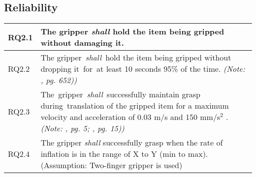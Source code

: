 \documentclass[lettersize,journal]{IEEEtran}
\begin{document}
\subsection{Reliability}\label{reliability}
\begin{center}
	\begin{tabular}{|p{7mm}|p{72mm}|}
		\hline
		RQ2.1 & The gripper \emph{shall} hold the item being gripped without damaging it.  \\ 
		\hline
		RQ2.2 & The gripper \emph{shall} hold the item being gripped without dropping it for at least 10 seconds 95\% of the time.  \emph{(Note: \cite{Sotiropoulos2018}, pg. 652))}\\ 
		\hline
		RQ2.3 & The gripper \emph{shall} successfully maintain grasp during translation of the gripped item for a maximum velocity and acceleration of 0.03 m/s and 150 mm/s$^2$ . \emph{(Note: \cite{Triantafyllou2019}, pg. 5; \cite{Cheng2021}, pg. 15))}\\
		\hline
		RQ2.4& The gripper \emph{shall} successfully grasp when the rate of inflation is in the range of X to Y (min to max). (Assumption: Two-finger gripper is used)\\	[1ex] 
		\hline
	\end{tabular}
\end{center}
\end{document}
